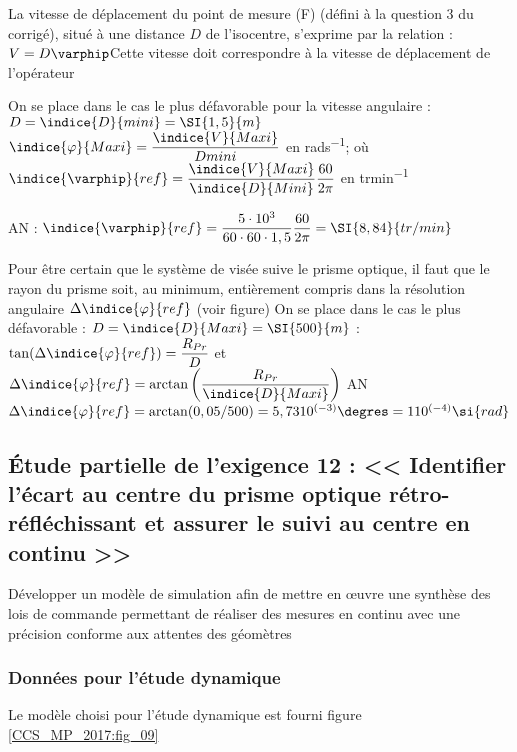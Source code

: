\ifprof
\begin{corrige}
La vitesse de déplacement du point de mesure (F) (défini à la question 3 du corrigé), situé à une distance $D$ de l’isocentre, s’exprime par la relation : $V=D\varphip$Cette vitesse doit correspondre à la vitesse de déplacement de l’opérateur 

On se place dans le cas le plus défavorable pour la vitesse angulaire : $D=\indice{D}{mini} = \SI{1,5}{m}$ 
$\indice{\varphi}{Maxi} = \dfrac{\indice{V}{Maxi}}{{D}{mini}}$ en \si{rads^{-1}};  où 
$\indice{\varphip}{ref} = \dfrac{\indice{V}{Maxi}}{\indice{D}{Mini}} \dfrac{60}{2\pi}$ en \si{trmin^{-1}}

AN : $\indice{\varphip}{ref} = \dfrac{5\cdot 10^3 }{60\cdot 60\cdot 1,5} \dfrac{60}{2\pi} =\SI{8,84}{tr/min}$

Pour être certain que le système de visée suive le prisme optique, il faut que le rayon du prisme soit, au minimum, entièrement compris dans la résolution angulaire $\Delta \indice{\varphi}{ref}$ (voir figure)
On se place dans le cas le plus défavorable : $D=\indice{D}{Maxi} =\SI{500}{m}$ :  
$\tan(\Delta \indice{\varphi}{ref})=\dfrac{R_{Pr}}{D}$ et $\Delta \indice{\varphi}{ref}=\arctan\left(\dfrac{R_{Pr}}{\indice{D}{Maxi}}\right)$
AN  $\Delta \indice{\varphi}{ref}=\arctan(0,05/500)=5,7310^{(-3)}\degres =110^{(-4)} \si{rad}$

\end{corrige}
\else
\fi


\subsection{Étude partielle de l'exigence 12 : << Identifier l'écart au centre du prisme optique rétro-réfléchissant et assurer le suivi au centre en continu >>}

\ifprof
\else
\begin{obj}
Développer un modèle de simulation afin de mettre en œuvre une synthèse des lois de commande permettant de réaliser des mesures en continu avec une précision conforme aux attentes des géomètres
\end{obj}

\subsubsection{Données pour l'étude dynamique}
Le modèle choisi pour l'étude dynamique est fourni figure \ref{CCS_MP_2017:fig_09} \\



